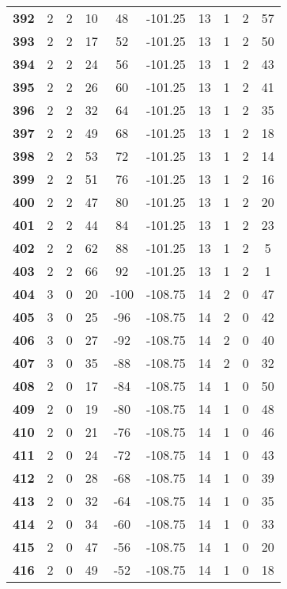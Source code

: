 \documentclass[12pt,letterpaper, onecolumn]{exam}
\begin{document}
\begin{longtable}{cccccccccc}
    \textbf{392} & 2 & 2 & 10 & 48 & -101.25 & 13 & 1 & 2 & 57 \\ 
    \textbf{393} & 2 & 2 & 17 & 52 & -101.25 & 13 & 1 & 2 & 50 \\ 
    \textbf{394} & 2 & 2 & 24 & 56 & -101.25 & 13 & 1 & 2 & 43 \\ 
    \textbf{395} & 2 & 2 & 26 & 60 & -101.25 & 13 & 1 & 2 & 41 \\ 
    \textbf{396} & 2 & 2 & 32 & 64 & -101.25 & 13 & 1 & 2 & 35 \\ 
    \textbf{397} & 2 & 2 & 49 & 68 & -101.25 & 13 & 1 & 2 & 18 \\ 
    \textbf{398} & 2 & 2 & 53 & 72 & -101.25 & 13 & 1 & 2 & 14 \\ 
    \textbf{399} & 2 & 2 & 51 & 76 & -101.25 & 13 & 1 & 2 & 16 \\ 
    \textbf{400} & 2 & 2 & 47 & 80 & -101.25 & 13 & 1 & 2 & 20 \\ 
    \textbf{401} & 2 & 2 & 44 & 84 & -101.25 & 13 & 1 & 2 & 23 \\      \hline
    \textbf{402} & 2 & 2 & 62 & 88 & -101.25 & 13 & 1 & 2 & 5 \\ 
    \textbf{403} & 2 & 2 & 66 & 92 & -101.25 & 13 & 1 & 2 & 1 \\ 
    \textbf{404} & 3 & 0 & 20 & -100 & -108.75 & 14 & 2 & 0 & 47 \\ 
    \textbf{405} & 3 & 0 & 25 & -96 & -108.75 & 14 & 2 & 0 & 42 \\ 
    \textbf{406} & 3 & 0 & 27 & -92 & -108.75 & 14 & 2 & 0 & 40 \\ 
    \textbf{407} & 3 & 0 & 35 & -88 & -108.75 & 14 & 2 & 0 & 32 \\ 
    \textbf{408} & 2 & 0 & 17 & -84 & -108.75 & 14 & 1 & 0 & 50 \\ 
    \textbf{409} & 2 & 0 & 19 & -80 & -108.75 & 14 & 1 & 0 & 48 \\ 
    \textbf{410} & 2 & 0 & 21 & -76 & -108.75 & 14 & 1 & 0 & 46 \\ 
    \textbf{411} & 2 & 0 & 24 & -72 & -108.75 & 14 & 1 & 0 & 43 \\ 
    \textbf{412} & 2 & 0 & 28 & -68 & -108.75 & 14 & 1 & 0 & 39 \\ 
    \textbf{413} & 2 & 0 & 32 & -64 & -108.75 & 14 & 1 & 0 & 35 \\ 
    \textbf{414} & 2 & 0 & 34 & -60 & -108.75 & 14 & 1 & 0 & 33 \\ 
    \textbf{415} & 2 & 0 & 47 & -56 & -108.75 & 14 & 1 & 0 & 20 \\ 
    \textbf{416} & 2 & 0 & 49 & -52 & -108.75 & 14 & 1 & 0 & 18 \\ 

\end{longtable}
\end{document}
